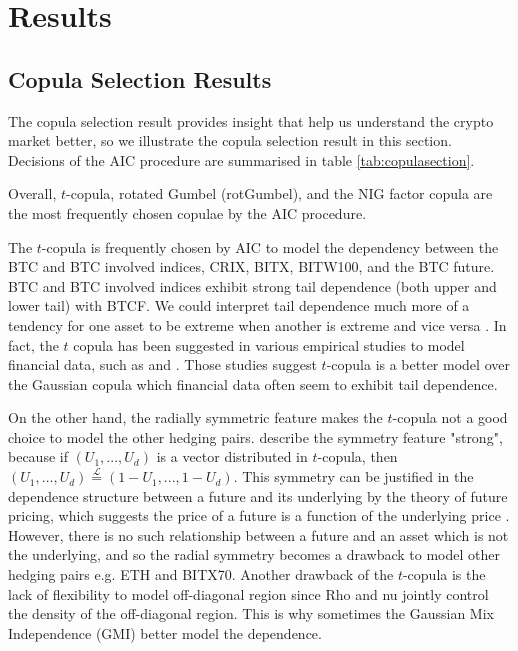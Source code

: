 \section{Results}\label{sec:results}

%

\subsection{Copula Selection Results}\label{sec: copula results}
The copula selection result provides insight that help us understand the crypto market better, so
we illustrate the copula selection result in this section.
Decisions of the AIC procedure are summarised in table \ref{tab:copulasection}. \medskip

Overall, $t$-copula, rotated Gumbel (rotGumbel), and the NIG factor copula are the most frequently chosen copulae by the AIC procedure. \medskip

The $t$-copula is frequently chosen by AIC to model the dependency between the BTC and BTC involved indices, CRIX, BITX, BITW100, and the BTC future.
BTC and BTC involved indices exhibit strong tail dependence (both upper and lower tail) with BTCF.
We could interpret tail dependence much more of a tendency for one asset to be extreme when another is extreme and vice versa \citep{McNeil2015}.
In fact, the $t$ copula has been suggested in various empirical studies to model financial data, such as \cite{zeevi2002beyond} and \cite{breymann2003dependence}.
Those studies suggest $t$-copula is a better model over the Gaussian copula which financial data often seem to exhibit tail dependence. \medskip

On the other hand, the radially symmetric feature makes the $t$-copula not a good choice to model the other hedging pairs.
\cite{demarta2005t} describe the symmetry feature "strong", because if $(U_1, ..., U_d)$ is a vector distributed in $t$-copula,
then $(U_1, ..., U_d) \overset{\mathcal{L}}= (1-U_1, ..., 1-U_d)$.
This symmetry can be justified in the dependence structure between a future and its underlying by the theory of future pricing,
which suggests the price of a future is a function of the underlying price \citep{hull2003options}.
However, there is no such relationship between a future and an asset which is not the underlying, and so the radial symmetry becomes a drawback to model other hedging pairs e.g. ETH and BITX70.
Another drawback of the $t$-copula is the lack of flexibility to model off-diagonal region since Rho and nu jointly control the density of the off-diagonal region.
This is why sometimes the Gaussian Mix Independence (GMI) better model the dependence.  \medskip

